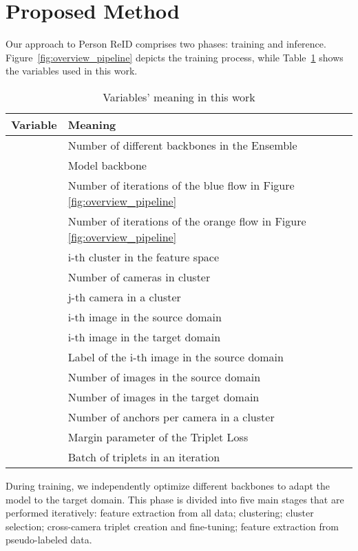 \documentclass[journal]{IEEEtran}
\begin{document}
\section{Proposed Method}
\label{sec:proposed_method}

Our approach to Person ReID comprises two phases: training and inference.  Figure~\ref{fig:overview_pipeline} depicts the 
training process, while 
Table~\ref{tab:terminology} shows the variables used in this work.

\begin{table}[ht]
\caption{Variables' meaning in this work} \label{tab:terminology}
\centering
\begin{tabular}{|p{1.0cm}|p{6.0cm}|}
\hline
\hline
Variable & Meaning  \\ \hline
 & Number of different backbones in the Ensemble \\
 & Model backbone \\ 
 & Number of iterations of the blue flow in Figure \ref{fig:overview_pipeline} \\
 & Number of iterations of the orange flow in Figure \ref{fig:overview_pipeline} \\
 & i-th cluster in the feature space \\
 & Number of cameras in cluster  \\
 & j-th camera in a cluster \\
 & i-th image in the source domain \\
 & i-th image in the target domain \\
 & Label of the i-th image in the source domain \\
 & Number of images in the source domain \\
 & Number of images in the target domain \\
 & Number of anchors per camera in a cluster \\
 & Margin parameter of the Triplet Loss \\
 & Batch of triplets in an iteration \\

\hline
\end{tabular}
\end{table}

During training, we independently optimize  different backbones to adapt the model to the target domain. This phase is divided into five main stages that are performed iteratively: feature extraction from all data; clustering; cluster selection; cross-camera triplet creation and fine-tuning; feature extraction from pseudo-labeled data.
\end{document}
